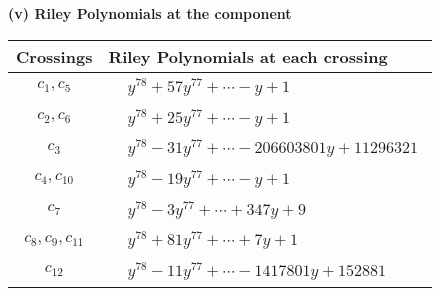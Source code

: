 \documentclass[1p]{elsarticle_modified}
\theoremstyle{definition}
\begin{document}
\newpage\renewcommand{\arraystretch}{1}
\flushleft \textbf{(v) Riley Polynomials at the component}\newline \\
\begin{tabular}{m{50pt}|m{274pt}}
Crossings & \hspace{64pt}Riley Polynomials at each crossing \\
\hline $$\begin{aligned}c_{1},c_{5}\end{aligned}$$&$\begin{aligned}
&y^{78}+57 y^{77}+\cdots- y+1
\end{aligned}$\\
\hline $$\begin{aligned}c_{2},c_{6}\end{aligned}$$&$\begin{aligned}
&y^{78}+25 y^{77}+\cdots- y+1
\end{aligned}$\\
\hline $$\begin{aligned}c_{3}\end{aligned}$$&$\begin{aligned}
&y^{78}-31 y^{77}+\cdots-206603801 y+11296321
\end{aligned}$\\
\hline $$\begin{aligned}c_{4},c_{10}\end{aligned}$$&$\begin{aligned}
&y^{78}-19 y^{77}+\cdots- y+1
\end{aligned}$\\
\hline $$\begin{aligned}c_{7}\end{aligned}$$&$\begin{aligned}
&y^{78}-3 y^{77}+\cdots+347 y+9
\end{aligned}$\\
\hline $$\begin{aligned}c_{8},c_{9},c_{11}\end{aligned}$$&$\begin{aligned}
&y^{78}+81 y^{77}+\cdots+7 y+1
\end{aligned}$\\
\hline $$\begin{aligned}c_{12}\end{aligned}$$&$\begin{aligned}
&y^{78}-11 y^{77}+\cdots-1417801 y+152881
\end{aligned}$\\
\hline
\end{tabular}\\~\\
\end{document}

